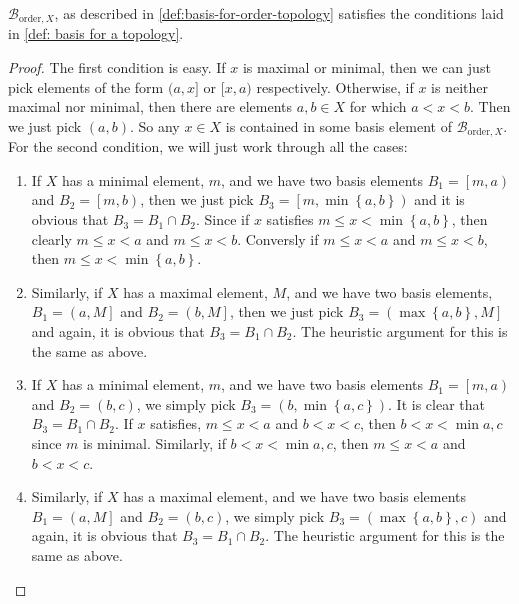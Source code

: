 \begin{lemma}
    \( \mathscr{B}_{\mathrm{order}, X} \), as described in \cref{def:basis-for-order-topology} satisfies the conditions laid in \cref{def: basis for a topology}.
\end{lemma}
\begin{proof}
    The first condition is easy. If \( x \) is maximal or minimal, then we can just pick elements of the form \( (a,x] \) or \( [x,a) \) respectively. Otherwise, if \( x \) is neither maximal nor minimal, then there are elements \( a,b \in X \) for which \( a< x <b\). Then we just pick \( (a,b) \). So any \( x \in X\) is contained in some basis element of \( \mathscr{B}_{\mathrm{order}, X} \). \\ 
    For the second condition, we will just work through all the cases:
    \begin{enumerate}[label=\textbf{\roman*)}]
      \item If \( X \) has a minimal element, \( m \), and we have two basis elements \( B_{1} = \left[ m, a \right) \) and \( B_{2} = \left[ m,b \right) \), then we just pick \( B_{3} = \left[ m, \min \left\{ a,b \right\} \right) \) and it is obvious that \( B_{3} = B_{1} \cap B_{2} \). Since if \( x \) satisfies \( m \le x < \min \left\{ a,b \right\} \), then clearly \( m \le x <a \) and \( m \le x <b \). Conversly if  \( m \le x <a \) and \( m \le x <b \), then \( m \le x < \min \left\{ a,b \right\} \). 
      \item Similarly, if \( X \) has a maximal element, \( M \), and we have two basis elements, \( B_{1} = \left( a,M \right] \) and  \( B_{2} = \left( b,M \right] \), then we just pick \( B_{3} = \left( \max \left\{ a,b \right\},M \right] \) and again, it is obvious that  \( B_{3} = B_{1} \cap B_{2} \). The heuristic argument for this is the same as above. 
      \item If \( X \) has a minimal element, \( m \), and we have two basis elements \( B_{1} = \left[ m, a \right) \) and \( B_{2} = \left( b,c \right) \), we simply pick \( B_{3} = \left( b, \min \left\{ a,c \right\} \right) \). It is clear that \( B_{3} = B_{1} \cap B_{2} \). If \( x \) satisfies, \( m \le x <a \) and \( b < x <c \), then \( b < x <  \min{a,c}\) since \( m \) is minimal. Similarly, if \( b < x <  \min{a,c}\), then \( m \le x <a \) and \( b < x <c \).
      \item Similarly, if \( X \) has a maximal element, and we have two basis elements \( B_{1} = \left( a, M \right] \) and \( B_{2} = \left( b,c \right) \), we simply pick \( B_{3} = \left( \max \left\{ a,b \right\} ,c\right) \)  and again, it is obvious that  \( B_{3} = B_{1} \cap B_{2} \). The heuristic argument for this is the same as above. 

\end{enumerate}
\end{proof}
